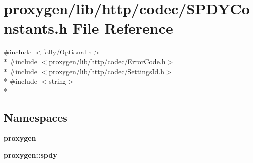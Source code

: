\section{proxygen/lib/http/codec/\+S\+P\+D\+Y\+Constants.h File Reference}
\label{SPDYConstants_8h}
{\ttfamily \#include $<$folly/\+Optional.\+h$>$}\\*
{\ttfamily \#include $<$proxygen/lib/http/codec/\+Error\+Code.\+h$>$}\\*
{\ttfamily \#include $<$proxygen/lib/http/codec/\+Settings\+Id.\+h$>$}\\*
{\ttfamily \#include $<$string$>$}\\*
\subsection*{Namespaces}
\begin{DoxyCompactItemize}
\item 
 {\bf proxygen}
\item 
 {\bf proxygen\+::spdy}
\end{DoxyCompactItemize}
